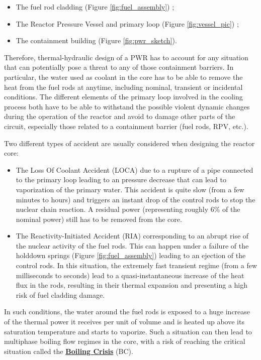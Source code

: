 \begin{itemize}
\item The fuel rod cladding (Figure \ref{fig:fuel_assembly}) ;
\item The Reactor Pressure Vessel and primary loop (Figure \ref{fig:vessel_pic}) ;
\item The containment building (Figure \ref{fig:pwr_sketch}).
\end{itemize}


Therefore, thermal-hydraulic design of a PWR has to account for any situation that can potentially pose a threat to any of those containment barriers. In particular, the water used as coolant in the core has to be able to remove the heat from the fuel rods at anytime, including nominal, transient or incidental conditions. The different elements of the primary loop involved in the cooling process both have to be able to withstand the possible violent dynamic changes during the operation of the reactor and avoid to damage other parts of the circuit, especially those related to a containment barrier (fuel rods, RPV, etc.).


\npar

Two different types of accident are usually considered when designing the reactor core:

\begin{itemize}
\item The Loss Of Coolant Accident (LOCA) due to a rupture of a pipe connected to the primary loop leading to an pressure decrease that can lead to vaporization of the primary water. This accident is quite slow (from a few minutes to hours) and triggers an instant drop of the control rods to stop the nuclear chain reaction. A residual power (representing roughly 6\% of the nominal power) still has to be removed from the core.

\item The Reactivity-Initiated Accident (RIA) corresponding to an abrupt rise of the nuclear activity of the fuel rods. This can happen under a failure of the holddown springs (Figure \ref{fig:fuel_assembly}) leading to an ejection of the control rods. In this situation, the extremely fast transient regime (from a few milliseconds to seconds) lead to a quasi-instantaneous increase of the heat flux in the rods, resulting in their thermal expansion and presenting a high risk of fuel cladding damage. 
\end{itemize}


In such conditions, the water around the fuel rods is exposed to a huge increase of the thermal power it receives per unit of volume and is heated up above its saturation temperature and starts to vaporize. Such a situation can then lead to multiphase boiling flow regimes in the core, with a risk of reaching the critical situation called the \textbf{\underline{Boiling Crisis}} (BC).

